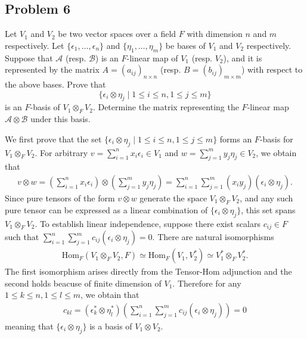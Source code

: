 \subsection*{Problem 6}
Let $V_1$ and $V_2$ be two vector spaces over a field $F$ with dimension $n$ and $m$ respectively. Let $\{\epsilon_1, \dots, \epsilon_n\}$ and $\{\eta_1, \dots, \eta_m\}$ be bases of $V_1$ and $V_2$ respectively. Suppose that $\mathscr{A}$ (resp. $\mathscr{B}$) is an $F$-linear map of $V_1$ (resp. $V_2$), and it is represented by the matrix $A = (a_{ij})_{n \times n}$ (resp. $B = (b_{ij})_{m \times m}$) with respect to the above bases. Prove that 
\[ \{\epsilon_i \otimes \eta_j \mid 1 \le i \le n, 1 \le j \le m\} \]
is an $F$-basis of $V_1 \otimes_F V_2$. Determine the matrix representing the $F$-linear map $\mathscr{A} \otimes \mathscr{B}$ under this basis.
\begin{solution}
    We first prove that the set $\{\epsilon_i \otimes \eta_j \mid 1 \leq i \leq n, 1 \leq j \leq m\}$ forms an $F$-basis for $V_1 \otimes_F V_2$.
    For arbitrary $v=\sum_{i=1}^n x_i \epsilon_i \in V_1$ and $w =\sum_{j=1}^m y_j \eta_j\in V_2$, we obtain that 
    \begin{align*}
        v \otimes w = (\sum_{i=1}^n x_i \epsilon_i) \otimes (\sum_{j=1}^m y_j \eta_j) = \sum_{i=1}^n \sum_{j=1}^m (x_i y_j) (\epsilon_i \otimes \eta_j).
    \end{align*}
    Since pure tensors of the form $v \otimes w$ generate the space $V_1 \otimes_F V_2$, and any such pure tensor can be expressed as a linear combination of $\{\epsilon_i \otimes \eta_j\}$, this set spans $V_1 \otimes_F V_2$.
    To establish linear independence, suppose there exist scalars $c_{ij} \in F$ such that $\sum_{i=1}^n \sum_{j=1}^m c_{ij} (\epsilon_i \otimes \eta_j) = 0$.
    There are natural isomorphisms
    \begin{align*}
        \text{Hom}_F(V_1\otimes_F V_2,F)\simeq \text{Hom}_F(V_1,V_2^*)\simeq V_1^* \otimes_F V_2^*.
    \end{align*}
    The first isomorphism arises directly from the Tensor-Hom adjunction and the second holds beacuse of finite dimension of $V_1$.  Therefore for any $1\le k\le n,1\le l\le m$, we obtain that
    \begin{align*}
        c_{kl} = (\epsilon_k^*\otimes \eta_l^*)\left(\sum_{i=1}^n \sum_{j=1}^m c_{ij} (\epsilon_i \otimes \eta_j)\right)  = 0
    \end{align*}
    meaning that $\{\epsilon_i \otimes \eta_j\}$ is a basis of $V_1\otimes V_2$.


\end{solution}
